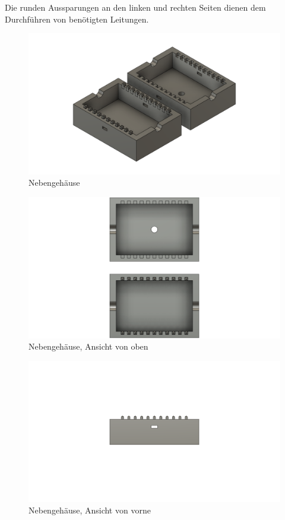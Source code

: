 Die runden Aussparungen an den linken und rechten Seiten dienen dem Durchführen von benötigten Leitungen.
\begin{figure}[H]
  \centering
  \includegraphics[width=\textwidth]{./img/ST_Halterv5}
  \caption{Nebengehäuse}\label{fig:secondary}
\end{figure}
\begin{figure}[H]
  \centering
  \includegraphics[width=\textwidth]{./img/ST_Halterv5_top}
  \caption{Nebengehäuse, Ansicht von oben}\label{fig:secondary_top}
\end{figure}
\begin{figure}[H]
  \centering
  \includegraphics[width=\textwidth]{./img/ST_Halterv5_front}
  \caption{Nebengehäuse, Ansicht von vorne}\label{fig:secondary_front}
\end{figure}
